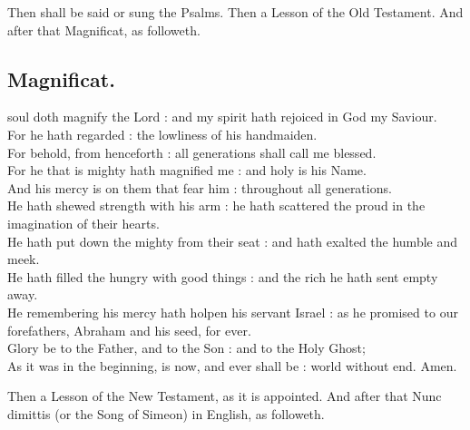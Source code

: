 

\begin{rubric}
Then shall be said or sung the Psalms. Then a Lesson of the Old Testament. And after that Magnificat, as followeth.
\end{rubric}

\subsection{Magnificat.}

 soul doth magnify the Lord : and my spirit hath rejoiced in God my Saviour.\\
For he hath regarded : the lowliness of his handmaiden.\\
For behold, from henceforth : all generations shall call me blessed.\\
For he that is mighty hath magnified me : and holy is his Name.\\
And his mercy is on them that fear him : throughout all generations.\\
He hath shewed strength with his arm : he hath scattered the proud in the imagination of their hearts.\\
He hath put down the mighty from their seat : and hath exalted the humble and meek.\\
He hath filled the hungry with good things : and the rich he hath sent empty away.\\
He remembering his mercy hath holpen his servant Israel : as he promised to our forefathers, Abraham and his seed, for ever.\\
Glory be to the Father, and to the Son : and to the Holy Ghost;\\
As it was in the beginning, is now, and ever shall be : world without end. Amen.

\begin{rubric}
Then a Lesson of the New Testament, as it is appointed. And after that Nunc dimittis (or the Song of Simeon) in English, as followeth.
\end{rubric}

